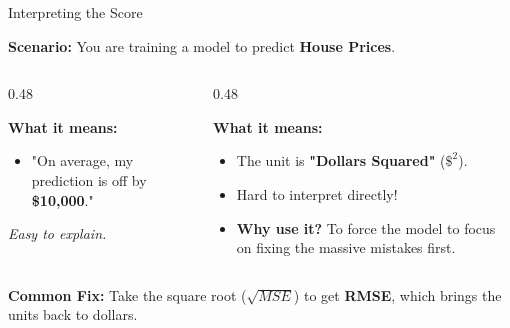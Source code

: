 \begin{frame}{Interpreting the Score}

    \textbf{Scenario:} You are training a model to predict \textbf{House Prices}.
    
    \vspace{1em}
    
    \begin{columns}[T]
        \begin{column}{0.48\textwidth}
            \begin{tcolorbox}[colback=blue!5, colframe=blue!50, title={$MAE = 10{,}000$}]
                \textbf{What it means:}
                \vspace{0.5em}
                \begin{itemize}
                    \item "On average, my prediction is off by \textbf{\$10,000}."
                \end{itemize}
                \vspace{0.5em}
                \textit{Easy to explain.}
            \end{tcolorbox}
        \end{column}
        
        \begin{column}{0.48\textwidth}
            \begin{tcolorbox}[colback=darkred!5, colframe=darkred!90, title={$MSE = 100{,}000{,}000$}]
                \textbf{What it means:}
                \vspace{0.5em}
                \begin{itemize}
                    \item The unit is \textbf{"Dollars Squared"} ($\$^{2}$).
                    \item Hard to interpret directly!
                    \item \textbf{Why use it?} To force the model to focus on fixing the massive mistakes first.
                \end{itemize}
            \end{tcolorbox}
        \end{column}
    \end{columns}
    
    \centering
    \small \textbf{Common Fix:} Take the square root ($\sqrt{MSE}$) to get \textbf{RMSE}, which brings the units back to dollars.
\end{frame}

